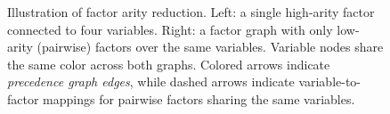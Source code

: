 \begin{figure}[H]
\caption{Illustration of factor arity reduction.
Left: a single high-arity factor connected to four variables.
Right: a factor graph with only low-arity (pairwise) factors over the same variables.
Variable nodes share the same color across both graphs.
Colored arrows indicate \emph{precedence graph edges}, while dashed arrows indicate variable-to-factor mappings for pairwise factors sharing the same variables.}
\label{fig:chapter_5_factor_graph_precedence}
\end{figure}
